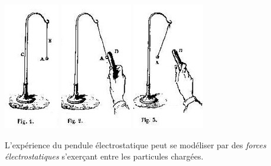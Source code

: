 \begin{center}
\includegraphics[scale=0.9]{./theorieDesChamps/Mascart01}
\hspace{0.3cm}
\includegraphics[scale=0.9]{./theorieDesChamps/Mascart02}
\hspace{0.3cm}
\includegraphics[scale=0.9]{./theorieDesChamps/Mascart03}
\end{center}

L'expérience du pendule électrostatique peut se modéliser par des {\it forces électrostatiques} s'exerçant entre les particules chargées.


